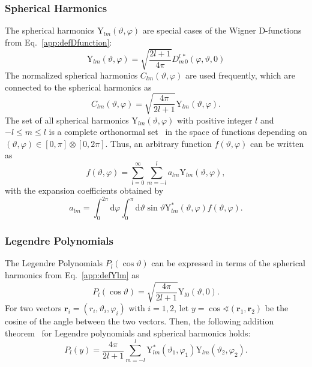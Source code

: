 \subsubsection*{Spherical Harmonics}
The spherical harmonics $\text{Y}_{lm}(\vartheta,\varphi)$ are special cases of the Wigner D-functions~\cite{varshalovich1988} from Eq.~\eqref{app:defDfunction}:
\begin{equation}
\label{app:defYlm}
\text{Y}_{lm}(\vartheta,\varphi)=\sqrt{\frac{2l+1}{4\pi}}
D^{l\,*}_{m\,0}(\varphi,\vartheta,0)
\end{equation}
The normalized spherical harmonics $C_{lm}(\vartheta,\varphi)$ are used frequently, which are connected to the spherical harmonics as
\begin{equation}
C_{lm}(\vartheta,\varphi) = \sqrt{\frac{4\pi}{2l+1}}\text{Y}_{lm}(\vartheta,\varphi).
\end{equation}
The set of all spherical harmonics $\text{Y}_{lm}(\vartheta,\varphi)$ with positive integer $l$ and $-l\leq m \leq l$ is a complete orthonormal set~\cite{varshalovich1988} in the space of functions depending on $(\vartheta,\varphi)\in [0,\pi]\otimes [0,2\pi]$. Thus, an arbitrary function $f(\vartheta,\varphi)$ can be written as
\begin{equation}
f(\vartheta,\varphi)=\sum_{l=0}^\infty \sum_{m=-l}^l a_{lm}\text{Y}_{lm}(\vartheta,\varphi),
\end{equation}
with the expansion coefficients obtained by
\begin{equation}
a_{lm}=\int_0^{2\pi}\text{d}\varphi\int_0^\pi\text{d}\vartheta \sin\vartheta \text{Y}^{*}_{lm}(\vartheta,\varphi)f(\vartheta,\varphi).
\end{equation}

\subsubsection*{Legendre Polynomials}
The Legendre Polynomials $P_l(\cos\vartheta)$ can be expressed in terms of the spherical harmonics from Eq.~\eqref{app:defYlm} as
\begin{equation}
P_l(\cos\vartheta)=\sqrt{\frac{4\pi}{2l+1}}\text{Y}_{l0}(\vartheta,0).
\end{equation}
For two vectors $\mathbf{r}_i=(r_i,\vartheta_i,\varphi_i)$ with $i=1,2$, let $y=\cos\sphericalangle(\mathbf{r}_1,\mathbf{r}_2)$ be the cosine of the angle between the two vectors. Then, the following addition theorem~\cite{varshalovich1988} for Legendre polynomials and spherical harmonics holds:
\begin{equation}
\label{eq:legendreAddTheorem}
P_l(y) = \frac{4\pi}{2l+1}\sum_{m=-l}^l \text{Y}_{lm}^*(\vartheta_1,\varphi_1)\text{Y}_{lm}(\vartheta_2,\varphi_2).
\end{equation}

